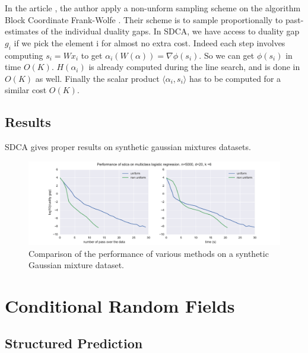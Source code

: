 \documentclass{article}
\DeclareMathOperator{\1}{\mathbb{1}}
\begin{document}
In the article \cite{osokin_minding_2016}, the author apply a non-unform sampling scheme on the algorithm Block Coordinate Frank-Wolfe \cite{lacoste-julien_block-coordinate_2012}. 
Their scheme is to sample proportionally to past-estimates of the individual duality gaps.
In SDCA, we have access to duality gap $g_i$ if we pick the element i for almost no extra cost.
Indeed each step involves computing $s_i = W x_i$ to get $\alpha_i(W(\alpha))=\nabla\phi(s_i)$.
So we can get $\phi(s_i)$ in time $O(K)$.
$H(\alpha_i)$ is already computed during the line search, and is done in $O(K)$ as well.
Finally the scalar product $\langle\alpha_i, s_i\rangle$ has to be computed for a similar cost $O(K)$.  


\subsection{Results}

SDCA gives proper results on synthetic gaussian mixtures datasets. 
\begin{figure}[ht]
	\label{gmm results}
	\includegraphics[width=\textwidth]{images/nonuniform_is_better.pdf}
	\caption{Comparison of the performance of various methods on a synthetic Gaussian mixture dataset.}
\end{figure}



\clearpage
\section{Conditional Random Fields}

\subsection{Structured Prediction}
\end{document}
